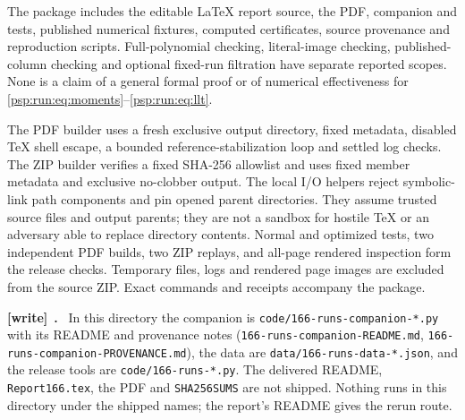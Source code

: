 \documentclass[11pt,letterpaper]{article}
\numberwithin{equation}{section}
\theoremstyle{remark}\newtheorem{remark}[theorem]{Remark}
\newcommand{\file}[1]{\nolinkurl{#1}}
\newenvironment{writenote}[1][]{\par\smallskip\begingroup\small
 \noindent\textbf{[write]}\if\relax\detokenize{#1}\relax\else~\textbf{#1.}\fi\ }%
 {\par\endgroup\smallskip}
\begin{document}
The package includes the editable \LaTeX{} report source, the PDF,
companion and tests, published numerical fixtures, computed certificates,
source provenance and reproduction scripts. Full-polynomial checking,
literal-image checking, published-column checking and optional
fixed-run filtration have separate reported scopes. None is a claim
of a general formal proof or of numerical effectiveness for
\eqref{psp:run:eq:moments}--\eqref{psp:run:eq:llt}.

The PDF builder uses a fresh exclusive output directory, fixed metadata,
disabled TeX shell escape, a bounded reference-stabilization loop and
settled log checks. The ZIP builder verifies a fixed SHA-256 allowlist
and uses fixed member metadata and exclusive no-clobber output.
The local I/O helpers reject symbolic-link path components and pin
opened parent directories. They assume trusted source files and output
parents; they are not a sandbox for hostile TeX or an adversary able to
replace directory contents. Normal and optimized tests, two independent
PDF builds, two ZIP replays, and all-page rendered inspection form the
release checks. Temporary files, logs and rendered page images are
excluded from the source ZIP. Exact commands and receipts accompany
the package.
\begin{writenote}
In this directory the companion is \file{code/166-runs-companion-*.py} with its README and provenance notes (\file{166-runs-companion-README.md}, \file{166-runs-companion-PROVENANCE.md}), the data are \file{data/166-runs-data-*.json}, and the release tools are \file{code/166-runs-*.py}. The delivered README, \file{Report166.tex}, the PDF and \file{SHA256SUMS} are not shipped. Nothing runs in this directory under the shipped names; the report's README gives the rerun route.
\end{writenote}
\clearpage
\end{document}
